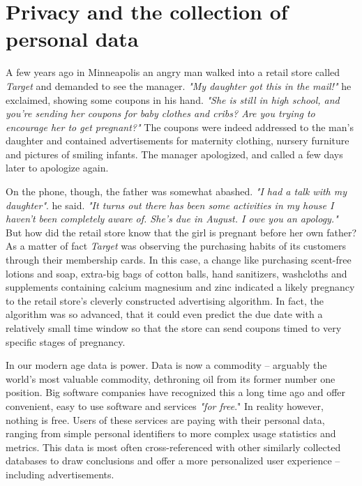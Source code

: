 \section{Privacy and the collection of personal data}

A few years ago in Minneapolis an angry man walked into a retail store called \textit{Target} and demanded to see the manager. \textit{"My daughter got this in the mail!"} he exclaimed, showing some coupons in his hand. \textit{"She is still in high school, and you're sending her coupons for baby clothes and cribs? Are you trying to encourage her to get pregnant?"} \cite{youtube01} \cite{nytimes01} The coupons were indeed addressed to the man's daughter and contained advertisements for maternity clothing, nursery furniture and pictures of smiling infants. The manager apologized, and called a few days later to apologize again.

On the phone, though, the father was somewhat abashed. \textit{"I had a talk with my daughter"}. he said. \textit{"It turns out there has been some activities in my house I haven't been completely aware of. She's due in August. I owe you an apology."} \cite{nytimes01} But how did the retail store know that the girl is pregnant before her own father? As a matter of fact \textit{Target} was observing the purchasing habits of its customers through their membership cards. In this case, a change like purchasing scent-free lotions and soap, extra-big bags of cotton balls, hand sanitizers, washcloths and supplements containing calcium magnesium and zinc indicated a likely pregnancy to the retail store's cleverly constructed advertising algorithm. In fact, the algorithm was so advanced, that it could even predict the due date with a relatively small time window so that the store can send coupons timed to very specific stages of pregnancy.

In our modern age data is power. Data is now a commodity -- arguably the world's most valuable commodity, dethroning oil from its former number one position. \cite{economist01} Big software companies have recognized this a long time ago and offer convenient, easy to use software and services \textit{"for free}." In reality however, nothing is free. Users of these services are paying with their personal data, ranging from simple personal identifiers to more complex usage statistics and metrics. This data is most often cross-referenced with other similarly collected databases to draw conclusions and offer a more personalized user experience -- including advertisements.

